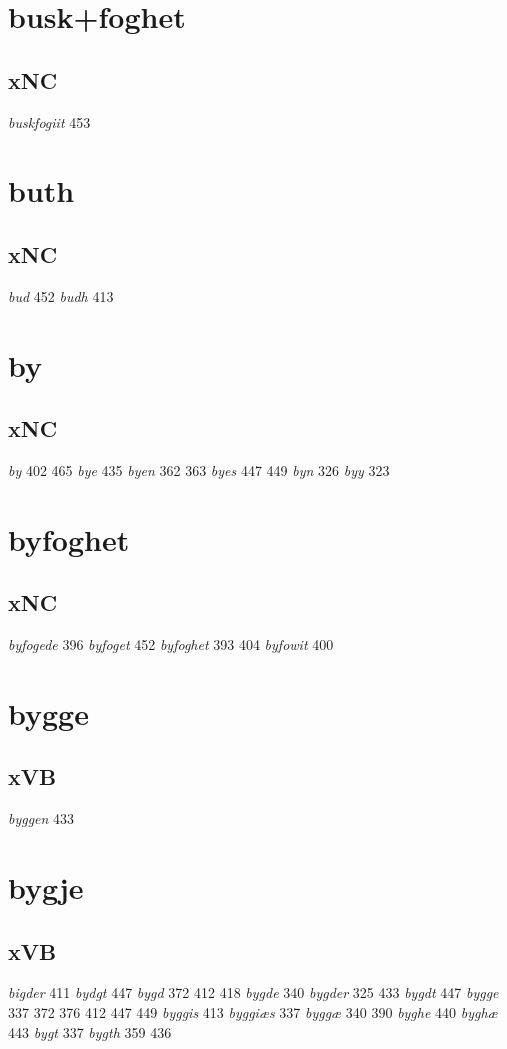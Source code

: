 \documentclass[a4paper,twocolumn]{article}
\begin{document}
\section{busk+foghet}
\label{sec:orgcfdb1d8}
\subsection{xNC}
\label{sec:org52c6b6e}
\emph{buskfogiit} 453 
\section{buth}
\label{sec:orgb23bf85}
\subsection{xNC}
\label{sec:orgad281ce}
\emph{bud} 452 \emph{budh} 413 
\section{by}
\label{sec:org5081e78}
\subsection{xNC}
\label{sec:org9a9754f}
\emph{by} 402 465 \emph{bye} 435 \emph{byen} 362 363 \emph{byes} 447 449 \emph{byn} 326 \emph{byy} 323 
\section{byfoghet}
\label{sec:orgf32dee6}
\subsection{xNC}
\label{sec:org9f3072d}
\emph{byfogede} 396 \emph{byfoget} 452 \emph{byfoghet} 393 404 \emph{byfowit} 400 
\section{bygge}
\label{sec:org946a973}
\subsection{xVB}
\label{sec:org42a9a23}
\emph{byggen} 433 
\section{bygje}
\label{sec:org96da56c}
\subsection{xVB}
\label{sec:org0e6fbf5}
\emph{bigder} 411 \emph{bydgt} 447 \emph{bygd} 372 412 418 \emph{bygde} 340 \emph{bygder} 325 433 \emph{bygdt} 447 \emph{bygge} 337 372 376 412 447 449 \emph{byggis} 413 \emph{byggiæs} 337 \emph{byggæ} 340 390 \emph{byghe} 440 \emph{byghæ} 443 \emph{bygt} 337 \emph{bygth} 359 436 
\end{document}
